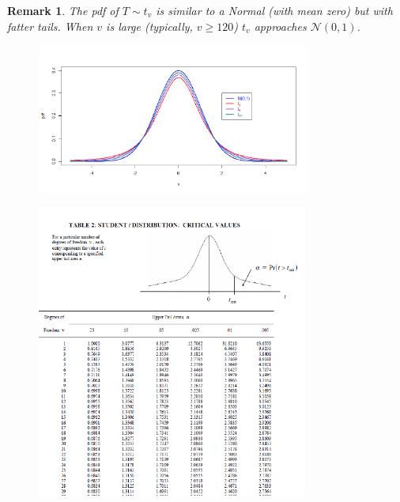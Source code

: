 \documentclass[smaller]{beamer}\usepackage[]{graphicx}\usepackage[]{color}
\newtheorem{remark}{Remark}[section]
\newcommand{\N}{\mathcal{N}}
\begin{document}
\begin{frame}{\secname}
  \begin{remark}
  The pdf of $T\sim t_{v}$ is similar to a Normal (with mean zero) but with fatter tails. When $v$ is large (typically, $v \geq 120$) $t_{v}$ approaches $\N(0,1)$.
  \end{remark}

  \begin{figure}[ptb]\centering
  \includegraphics[height=1.9398in, width=3.5345in]{img/student_t__4.pdf}%
  \end{figure}
\end{frame}

\begin{frame}{\secname}

\begin{figure}[ptb]\centering
\includegraphics[height=3.8in, width=3.506in]{img/Student_t_table__5.pdf}%
\end{figure}

\end{frame}

\end{document}
